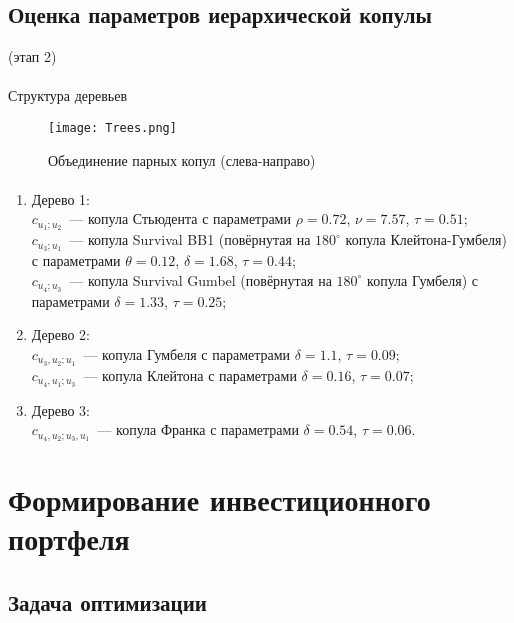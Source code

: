 \documentclass[aspectratio=169]{beamer}
\begin{document}
\subsection{Оценка параметров иерархической копулы}

\begin{frame}{{\insertsection} (этап 2)}
    \framesubtitle{\insertsubsection}
    \begin{block}{Структура деревьев}
    \begin{figure}
        \centering
        \texttt{[image: Trees.png]}
        \caption{Объединение парных копул (слева-направо)}
    \end{figure}
    \end{block}
\end{frame}

\begin{frame}{\insertsection}
    \framesubtitle{\insertsubsection}
    \begin{enumerate}[(1)]
        \item Дерево 1:\\
        $c_{u_1;u_2}$~--- копула Стьюдента с параметрами $\rho=0.72$, $\nu=7.57$, $\tau=0.51$;\\
        $c_{u_3;u_1}$~--- копула Survival BB1 (повёрнутая на $180^{\circ}$ копула Клейтона-Гумбеля) с параметрами $\theta=0.12$, $\delta=1.68$, $\tau=0.44$;\\
        $c_{u_4;u_3}$~--- копула Survival Gumbel (повёрнутая на $180^{\circ}$ копула Гумбеля) с параметрами $\delta=1.33$, $\tau=0.25$;
        \item Дерево 2:\\
        $c_{u_3,u_2;u_1}$~--- копула Гумбеля с параметрами $\delta=1.1$, $\tau=0.09$;\\
        $c_{u_4,u_1;u_3}$~--- копула Клейтона с параметрами $\delta=0.16$, $\tau=0.07$;
        \item Дерево 3:\\
        $c_{u_4,u_2;u_3,u_1}$~--- копула Франка с параметрами $\delta=0.54$, $\tau=0.06$.
    \end{enumerate}
\end{frame}

\section{Формирование инвестиционного портфеля}
\subsection{Задача оптимизации}
\end{document}
